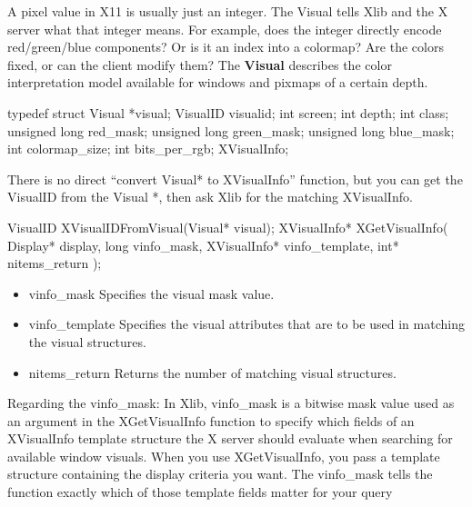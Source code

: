 \documentclass{report}
\begin{document}
\begin{itemize}
            \bigbreak \noindent 
            A pixel value in X11 is usually just an integer. The Visual tells Xlib and the X server what that integer means. For example, does the integer directly encode red/green/blue components? Or is it an index into a colormap? Are the colors fixed, or can the client modify them?
            \bigbreak \noindent 
            The \textbf{Visual} describes the color interpretation model available for windows and pixmaps of a certain depth.
            \bigbreak \noindent 
            \begin{cppcode}
                typedef struct {
                    Visual *visual;
                    VisualID visualid;
                    int screen;
                    int depth;
                    int class;
                    unsigned long red_mask;
                    unsigned long green_mask;
                    unsigned long blue_mask;
                    int colormap_size;
                    int bits_per_rgb;
                } XVisualInfo;
            \end{cppcode}
            \bigbreak \noindent 
            There is no direct “convert Visual* to XVisualInfo” function, but you can get the VisualID from the Visual *, then ask Xlib for the matching XVisualInfo.
            \bigbreak \noindent 
            \begin{cppcode}
                VisualID XVisualIDFromVisual(Visual* visual);
                XVisualInfo* XGetVisualInfo(
                    Display* display,
                    long vinfo_mask,
                    XVisualInfo* vinfo_template,
                    int* nitems_return
                );
            \end{cppcode}
            \bigbreak \noindent
            \begin{itemize}
                \item vinfo\_mask	Specifies the visual mask value.
                \item vinfo\_template	Specifies the visual attributes that are to be used in matching the visual structures.
                \item nitems\_return	Returns the number of matching visual structures.
            \end{itemize}
            Regarding the vinfo\_mask: In Xlib, vinfo\_mask is a bitwise mask value used as an argument in the XGetVisualInfo function to specify which fields of an XVisualInfo template structure the X server should evaluate when searching for available window visuals. When you use XGetVisualInfo, you pass a template structure containing the display criteria you want. The vinfo\_mask tells the function exactly which of those template fields matter for your query

\end{itemize}
\end{document}
